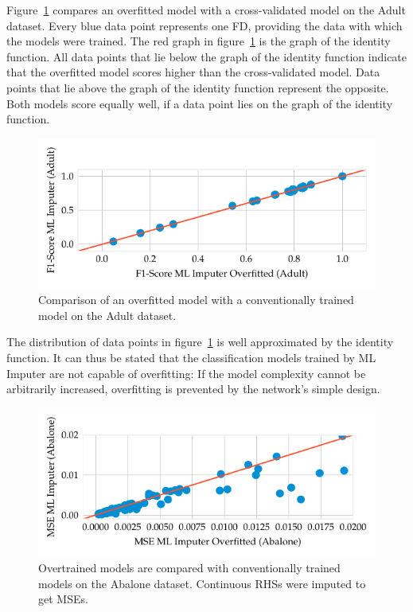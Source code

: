 Figure~\ref{fig:f1-ml-overfit-adult} compares an overfitted model with a cross-validated model on the Adult dataset.
Every blue data point represents one FD, providing the data with which the models were trained.
The red graph in figure~\ref{fig:f1-ml-overfit-adult} is the graph of the identity function.
All data points that lie below the graph of the identity function indicate that the overfitted model scores higher than the cross-validated model.
Data points that lie above the graph of the identity function represent the opposite.
Both models score equally well, if a data point lies on the graph of the identity function.
\begin{figure}[ht]
     \centering
     \includegraphics[width=\textwidth]{../figures/adult/f1_ml_overfit.pdf}
     \caption{Comparison of an overfitted model with a conventionally trained model on the Adult dataset.}
     \label{fig:f1-ml-overfit-adult}
\end{figure}
The distribution of data points in figure~\ref{fig:f1-ml-overfit-adult} is well approximated by the identity function.
It can thus be stated that the classification models trained by ML Imputer are not capable of overfitting:
If the model complexity cannot be arbitrarily increased, overfitting is prevented by the network's simple design.~\cite[ch.~6,~p.~51-52]{DUD00}
\begin{figure}[ht]
     \centering
     \includegraphics[width=\textwidth]{../figures/abalone/mse_ml_overfit.pdf}
     \caption{Overtrained models are compared with conventionally trained models on the Abalone dataset. Continuous RHSs were imputed to get MSEs.}
     \label{fig:mse-ml-overfit-abalone}
\end{figure}
